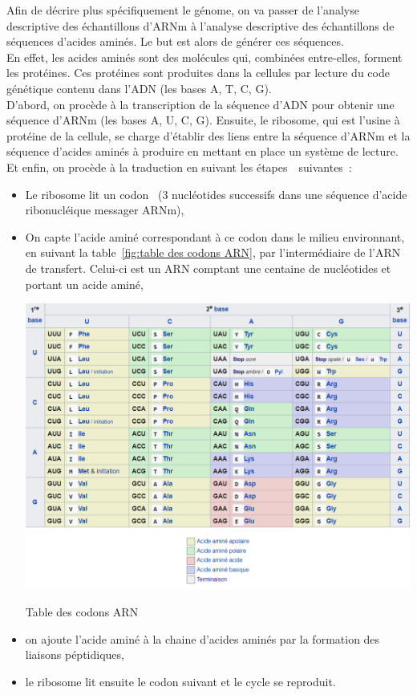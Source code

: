 \documentclass[12pt]{article}
\begin{document}
Afin de décrire plus spécifiquement le génome, on va passer de l'analyse descriptive des échantillons d'ARNm à l'analyse descriptive des échantillons de séquences d'acides aminés. Le but est alors de générer ces séquences. \\
En effet, les acides aminés sont des molécules qui, combinées entre-elles, forment les protéines. Ces protéines sont produites dans la cellules par lecture du code génétique contenu dans l'ADN (les bases A, T, C, G). \\
D'abord, on procède à la transcription de la séquence d'ADN pour obtenir une séquence d'ARNm (les bases A, U, C, G). Ensuite, le ribosome, qui est l'usine à protéine de la cellule, se charge  d'établir des liens entre la séquence d'ARNm et la séquence d'acides aminés à produire en mettant en place un système de lecture. Et enfin, on procède à la traduction en suivant les étapes~\cite{synthpep}~suivantes~: \\


\begin{itemize}
\item  Le ribosome lit un codon~\cite{codon} (3 nucléotides successifs dans une séquence d'acide ribonucléique messager ARNm),
\item  On capte l'acide aminé correspondant à ce codon dans le milieu environnant, en suivant la table~\ref{fig:table des codons ARN}, par l'intermédiaire de l'ARN de transfert. Celui-ci est un ARN comptant une centaine de nucléotides et portant un acide aminé,\\

        \begin{table}[!h]
             \centering
             \includegraphics[scale = 0.8]{Images/Codons/tableau des codons ARN.png}
             \caption{Table des codons ARN}
             \label{fig:table des codons ARN}
        \end{table}

\item on ajoute l'acide aminé à la chaine d'acides aminés par la formation des liaisons péptidiques,
\item le ribosome lit ensuite le codon suivant et le cycle se reproduit.
\end{itemize}
\end{document}
